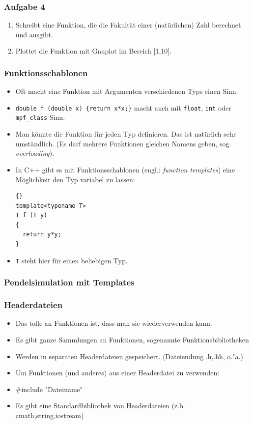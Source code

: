 \documentclass[ignorenonframetext,12pt]{beamer}
\theoremstyle{definition}
\theoremstyle{definition}
\begin{document}
\begin{frame}[fragile]
\frametitle{Aufgabe 4}
\begin{enumerate}
\item Schreibt eine Funktion, die die Fakultät einer (natürlichen) Zahl berechnet und ausgibt.
\item Plottet die Funktion mit Gnuplot im Bereich [1,10]. 
\end{enumerate}
\end{frame}

\begin{frame}[fragile]
\frametitle{Funktionsschablonen}
\begin{itemize}
\item Oft macht eine Funktion mit Argumenten verschiedenen Typs einen Sinn.
\item \lstinline!double f (double x) {return x*x;}! macht auch mit
  \lstinline{float}, \lstinline{int} oder \lstinline{mpf_class} Sinn.
\item Man könnte die Funktion für jeden Typ definieren. Das ist
  natürlich sehr umständlich. (Es darf mehrere Funktionen gleichen
  Namens geben, sog. \textsl{overloading}).
\item In C++ gibt es mit Funktionsschablonen (engl.: \textsl{function
  templates}) eine Möglichkeit den Typ variabel zu lassen:
{\scriptsize\begin{lstlisting}{}
template<typename T>
T f (T y)
{
  return y*y;
}
\end{lstlisting}}
\item \lstinline{T} steht hier für einen beliebigen Typ.
\end{itemize}
\end{frame}

\begin{frame}
\frametitle{Pendelsimulation mit Templates}

\end{frame}


\begin{frame}[fragile]
\frametitle{Headerdateien}
\begin{itemize}
\item Das tolle an Funktionen ist, dass man sie wiederverwenden kann.
\item Es gibt ganze Sammlungen an Funktionen, sogenannte Funktionsbibliotheken
\item Werden in separaten Headerdateien gespeichert. (Dateiendung .h,.hh, o."a.)
\item Um Funktionen (und anderes) aus einer Headerdatei zu verwenden:
\item \#include "Dateiname"
\item Es gibt eine Standardbibliothek von Headerdateien (z.b. cmath,string,iostream)

\end{itemize}
\end{frame}
\end{document}
